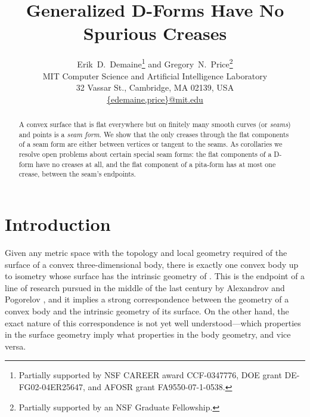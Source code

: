 \documentclass{article}
\begin{document}
\title{Generalized D-Forms Have No Spurious Creases}
\author{Erik~D.~Demaine\footnote{Partially supported by NSF CAREER
    award CCF-0347776, DOE grant DE-FG02-04ER25647, and AFOSR grant
    FA9550-07-1-0538.}
 and Gregory~N.~Price\footnote{Partially supported by an NSF
    Graduate Fellowship.}\\
  MIT Computer Science and Artificial Intelligence Laboratory \\
  32 Vassar St., Cambridge, MA 02139, USA \\
  \protect\url{{edemaine,price}@mit.edu}
} \date{}
\maketitle

\begin{abstract}
  A convex surface that is flat everywhere but on finitely many
  smooth curves (or \emph{seams}) and points is a \emph{seam form}.
  We show that the only creases through the flat components of a seam
  form are either between vertices or tangent to the seams.  As
  corollaries we resolve open problems about certain special seam
  forms: the flat components of a D-form have no creases at all, and the
  flat component of a pita-form has at most one crease, between the seam's
  endpoints.
\end{abstract}

\newpage

\section{Introduction} \label{sec:introduction}

Given any metric space  with the topology and local geometry
required of the surface of a convex three-dimensional body,
there is exactly one convex body up to isometry whose surface has
the intrinsic geometry of .  This is the endpoint of a line of
research pursued in the middle of the last century by Alexandrov and
Pogorelov \cite{Alexandrov}, and it implies a strong correspondence
between the geometry of a convex body and the intrinsic geometry of
its surface.  On the other hand, the exact nature of this
correspondence is not yet well understood---which properties in the
surface geometry imply what properties in the body geometry, and vice
versa.
\end{document}
